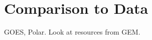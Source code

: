 
\chapter{Comparison to Data}
\label{data_chapter}

GOES, Polar. Look at resources from GEM. 






